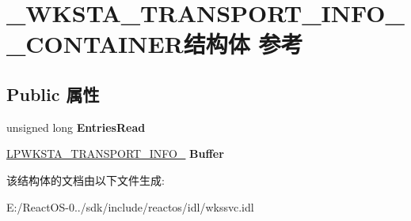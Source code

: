 \hypertarget{struct___w_k_s_t_a___t_r_a_n_s_p_o_r_t___i_n_f_o__0___c_o_n_t_a_i_n_e_r}{}\section{\+\_\+\+W\+K\+S\+T\+A\+\_\+\+T\+R\+A\+N\+S\+P\+O\+R\+T\+\_\+\+I\+N\+F\+O\+\_\+\_\+\+C\+O\+N\+T\+A\+I\+N\+E\+R结构体 参考}
\label{struct___w_k_s_t_a___t_r_a_n_s_p_o_r_t___i_n_f_o__0___c_o_n_t_a_i_n_e_r}
\subsection*{Public 属性}
\begin{DoxyCompactItemize}
\item 
\mbox{\label{struct___w_k_s_t_a___t_r_a_n_s_p_o_r_t___i_n_f_o__0___c_o_n_t_a_i_n_e_r_a5bec40d2e682916435198416e3cd83ab}} 
unsigned long {\bfseries Entries\+Read}
\item 
\mbox{\label{struct___w_k_s_t_a___t_r_a_n_s_p_o_r_t___i_n_f_o__0___c_o_n_t_a_i_n_e_r_a2f5b8994dc486e33707807e7aab57bab}} 
\hyperlink{struct___w_k_s_t_a___t_r_a_n_s_p_o_r_t___i_n_f_o__0}{L\+P\+W\+K\+S\+T\+A\+\_\+\+T\+R\+A\+N\+S\+P\+O\+R\+T\+\_\+\+I\+N\+F\+O\+\_} {\bfseries Buffer}
\end{DoxyCompactItemize}


该结构体的文档由以下文件生成\+:\begin{DoxyCompactItemize}
\item 
E\+:/\+React\+O\+S-\/0../sdk/include/reactos/idl/wkssvc.\+idl\end{DoxyCompactItemize}
